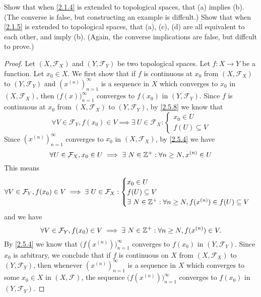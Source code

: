 \begin{ex}\label{ex:2.5.16}
  Show that when \cref{2.1.4} is extended to topological spaces, that (a) implies (b).
  (The converse is false, but constructing an example is diffcult.)
  Show that when \cref{2.1.5} is extended to topological spaces, that (a), (c), (d) are all equivalent to each other, and imply (b).
  (Again, the converse implications are false, but diffcult to prove.)
\end{ex}

\begin{proof}
  Let \((X, \mathcal{F}_X)\) and \((Y, \mathcal{F}_Y)\) be two topological spaces.
  Let \(f : X \to Y\) be a function.
  Let \(x_0 \in X\).
  We first show that if \(f\) is continuous at \(x_0\) from \((X, \mathcal{F}_X)\) to \((Y, \mathcal{F}_Y)\) and \((x^{(n)})_{n = 1}^\infty\) is a sequence in \(X\) which converges to \(x_0\) in \((X, \mathcal{F}_X)\), then \(\big(f(x)\big)_{n = 1}^\infty\) converges to \(f(x_0)\) in \((Y, \mathcal{F}_Y)\).
  Since \(f\) is continuous at \(x_0\) from \((X, \mathcal{F}_X)\) to \((Y, \mathcal{F}_Y)\), by \cref{2.5.8} we know that
  \[
    \forall V \in \mathcal{F}_Y, f(x_0) \in V \implies \exists\ U \in \mathcal{F}_X : \begin{cases}
      x_0 \in U \\
      f(U) \subseteq V
    \end{cases}
  \]
  Since \((x^{(n)})_{n = 1}^\infty\) converges to \(x_0\) in \((X, \mathcal{F}_X)\), by \cref{2.5.4} we have
  \[
    \forall U \in \mathcal{F}_X, x_0 \in U \implies \exists\ N \in \mathbb{Z}^+ : \forall n \geq N, x^{(n)} \in U
  \]
  This means
  \[
    \forall V \in \mathcal{F}_Y, f(x_0) \in V \implies \exists\ U \in \mathcal{F}_X : \begin{cases}
      x_0 \in U        \\
      f(U) \subseteq V \\
      \exists\ N \in \mathbb{Z}^+ : \forall n \geq N, f(x^{(n)}) \in f(U) \subseteq V
    \end{cases}
  \]
  and we have
  \[
    \forall V \in \mathcal{F}_Y, f(x_0) \in V \implies \exists\ N \in \mathbb{Z}^+ : \forall n \geq N, f(x^{(n)}) \in V.
  \]
  By \cref{2.5.4} we know that \(\big(f(x^{(n)})\big)_{n = 1}^\infty\) converges to \(f(x_0)\) in \((Y, \mathcal{F}_Y)\).
  Since \(x_0\) is arbitrary, we conclude that if \(f\) is continuous on \(X\) from \((X, \mathcal{F}_X)\) to \((Y, \mathcal{F}_Y)\), then whenever \((x^{(n)})_{n = 1}^\infty\) is a sequence in \(X\) which converges to some \(x_0 \in X\) in \((X, \mathcal{F})\), the sequence \(\big(f(x^{(n)})\big)_{n = 1}^\infty\) converges to \(f(x_0)\) in \((Y, \mathcal{F}_Y)\).


\end{proof}
